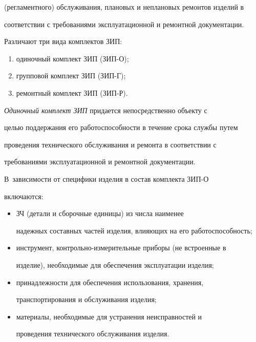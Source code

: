 (регламентного) обслуживания, плановых и неплановых ремонтов изделий в 


соответствии с требованиями эксплуатационной и ремонтной документации.


     


     Различают три вида комплектов ЗИП:


     \begin{enumerate}[(1)]


     \item  одиночный комплект ЗИП (ЗИП-О);\\[-9pt]


     \item  групповой комплект ЗИП (ЗИП-Г);\\[-9pt]


     \item ремонтный комплект ЗИП (ЗИП-Р).


     \end{enumerate}


     


     \textit{Одиночный комплект ЗИП} придается непосредственно объекту с 


целью поддержания его работоспособности в течение срока службы путем 


проведения технического обслуживания и ремонта в соответствии с 


требованиями эксплуатационной и ремонтной документации.


          В~зависимости от специфики изделия в состав комплекта ЗИП-О 


включаются:


     \begin{itemize}


     \item ЗЧ (детали и сборочные единицы) из числа наименее 


надежных составных частей изделия, влияющих на его работоспособность;


     \item инструмент, контрольно-измерительные приборы (не встроенные в 


изделие), необходимые для обеспечения эксплуатации изделия;


     \item принадлежности для обеспечения использования, хранения, 


транспортирования и обслуживания изделия;


     \item материалы, необходимые для устранения неисправностей и 


проведения технического обслуживания изделия.


     \end{itemize}


